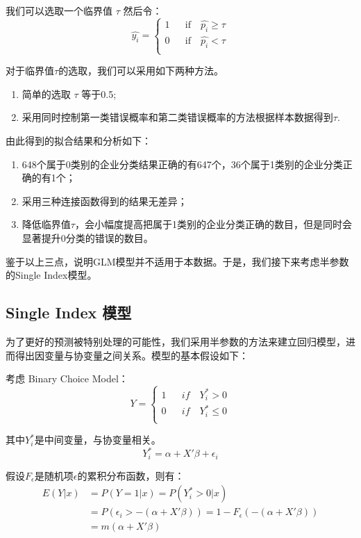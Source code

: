 \documentclass[a4paper,UTF8]{article}
\begin{document}
我们可以选取一个临界值 $\tau $ 然后令：
$$ \hat{y_{i}} = \left\{
\begin{array}{rcl}
1     &      & {\text{if} \quad \hat{p_{i}} \geq \tau}\\
0     &      & {\text{if} \quad \hat{p_{i}}<\tau}\\
\end{array} \right. $$

对于临界值$\tau $的选取，我们可以采用如下两种方法。
\begin{enumerate}[1.]
	\item 简单的选取 $\tau$ 等于0.5;
	\item 采用同时控制第一类错误概率和第二类错误概率的方法根据样本数据得到$\tau$.
\end{enumerate}

由此得到的拟合结果和分析如下：
\begin{enumerate}[(1)]
	\item 648个属于0类别的企业分类结果正确的有647个，36个属于1类别的企业分类正确的有1个；
	\item 采用三种连接函数得到的结果无差异；
	\item 降低临界值$\tau$，会小幅度提高把属于1类别的企业分类正确的数目，但是同时会显著提升0分类的错误的数目。
\end{enumerate}

鉴于以上三点，说明GLM模型并不适用于本数据。于是，我们接下来考虑半参数的Single Index模型。

\subsection{Single Index 模型}
为了更好的预测被特别处理的可能性，我们采用半参数的方法来建立回归模型，进而得出因变量与协变量之间关系。模型的基本假设如下：

考虑 Binary Choice Model：
$$ Y = \left\{
\begin{array}{rcl}
1     &      & {if \quad Y_i^{*}>0}\\
0     &      & {if \quad Y_i^{*}\leq0}\\
\end{array} \right. $$

其中$Y_i^{*}$是中间变量，与协变量相关。
\[ Y_i^{*}=\alpha+X'\beta+\epsilon_i \]

假设$F_\epsilon$是随机项$\epsilon$的累积分布函数，则有：
\begin{align*}
E(Y|x)&=P(Y=1|x)=P(Y_i^{*}>0|x)\\
&=P(\epsilon_i>-(\alpha+X'\beta))=1-F_\epsilon(-(\alpha+X'\beta))\\
&=m(\alpha+X'\beta)
\end{align*}
\end{document}
